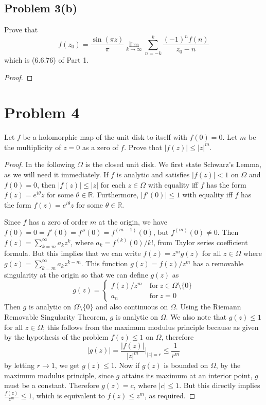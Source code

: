 \documentclass{article}[12pt]
\def\RR{\mathbb R}
\begin{document}
\subsection*{Problem 3(b)}Prove that
\[
f(z_0)=\frac{\sin(\pi z)}{\pi} \lim_{k\to\infty} \sum_{n=-k}^k
\frac{(-1)^nf(n)}{z_0-n}
\]
which is (6.6.76) of Part 1.
\begin{proof}

\end{proof}

\section*{Problem 4}Let $f$ be a holomorphic map of the unit disk
to itself with $f(0)=0$. Let $m$ be the multiplicity of $z=0$ as
a zero of $f$. Prove that $|f(z)|\le |z|^m$.
\begin{proof}
In the following $\Omega$ is the closed unit disk.
We first state Schwarz's Lemma, as we will need it immediately.
If $f$ is analytic and satisfies $|f(z)|<1$ on $\Omega$
and $f(0)=0$, then $|f(z)|\le |z|$ for each $z\in\Omega$ with
equality iff $f$ has the form $f(z)=e^{i\theta}z$ for some $\theta\in\RR$.
Furthermore, $|f'(0)|\le 1$ with equality iff 
$f$ has the form $f(z)=e^{i\theta}z$ for some $\theta\in\RR$.

Since $f$ has a zero of order $m$ at the origin, we have
$f(0)=0=f'(0)=f''(0)=f^{(m-1)}(0)$, but $f^{(m)}(0)\ne 0$.
Then $f(z)=\sum_{k=m}^\infty a_kz^k$, where $a_k=f^{(k)}(0)/k!$, from
Taylor series coefficient formula.
But this implies that we can write $f(z)=z^mg(z)$ for all $z\in\Omega$
where $g(z)=\sum_{k=m}^\infty a_kz^{k-m}$.
This function $g(z)=f(z)/z^m$ has a removable singularity at the 
origin so that we can define $g(z)$ as
\[
g(z) = \left\{ \begin{array}{lc} f(z)/z^m\ & \mbox{for}\ z\in\Omega\setminus \{0\} \\
a_n & \mbox{for}\ z=0 \end{array}\right.
\]
Then $g$ is analytic on $\Omega\setminus\{0\}$ and also continuous
on $\Omega$. Using the Riemann Removable Singularity Theorem,
$g$ is analytic on $\Omega$. 
We also note that $g(z)\le 1$ for all $z\in\Omega$; this follows
from the maximum modulus principle because as given by the hypothesis
of the problem $f(z)\le 1$ on $\Omega$, therefore
\[
|g(z)| = \frac{|f(z)|}{|z|^m}|_{|z|=r} \le \frac{1}{r^m}
\]
by letting $r\to 1$, we get $g(z)\le 1$.
Now if $g(z)$ is bounded on $\Omega$, by the maximum modulus principle,
since $g$ attains its maximum at an interior point, $g$ must be a constant.
Therefore $g(z)=c$, where $|c|\le 1$. But this directly implies 
$\frac{f(z)}{z^m}\le 1$, which is equivalent to $f(z)\le z^m$, as
required.
\end{proof}
\end{document}
